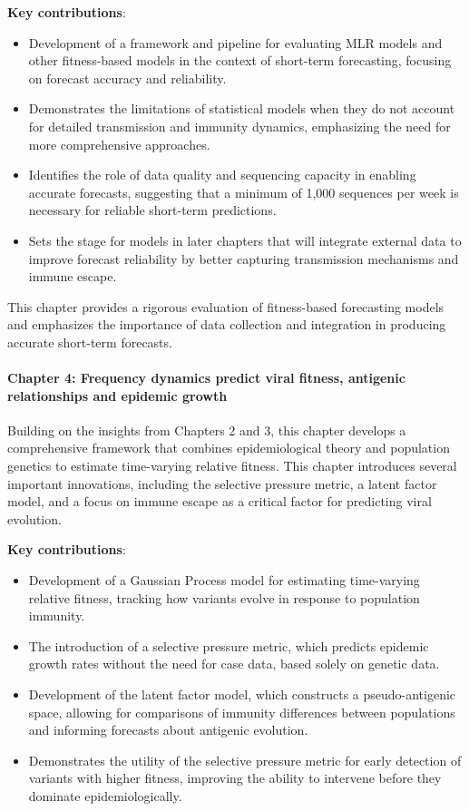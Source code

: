 \noindent\textbf{Key contributions}:
\begin{itemize}
        \item Development of a framework and pipeline for evaluating MLR models and other fitness-based models in the context of short-term forecasting, focusing on forecast accuracy and reliability.
        \item Demonstrates the limitations of statistical models when they do not account for detailed transmission and immunity dynamics, emphasizing the need for more comprehensive approaches.
        \item Identifies the role of data quality and sequencing capacity in enabling accurate forecasts, suggesting that a minimum of 1,000 sequences per week is necessary for reliable short-term predictions.
        \item Sets the stage for models in later chapters that will integrate external data to improve forecast reliability by better capturing transmission mechanisms and immune escape.
\end{itemize}

This chapter provides a rigorous evaluation of fitness-based forecasting models and emphasizes the importance of data collection and integration in producing accurate short-term forecasts.

\paragraph{Chapter 4: Frequency dynamics predict viral fitness, antigenic relationships and epidemic growth}

Building on the insights from Chapters 2 and 3, this chapter develops a comprehensive framework that combines epidemiological theory and population genetics to estimate time-varying relative fitness.
This chapter introduces several important innovations, including the selective pressure metric, a latent factor model, and a focus on immune escape as a critical factor for predicting viral evolution.

\noindent\textbf{Key contributions}:
\begin{itemize}
  \item Development of a Gaussian Process model for estimating time-varying relative fitness, tracking how variants evolve in response to population immunity.
  \item The introduction of a selective pressure metric, which predicts epidemic growth rates without the need for case data, based solely on genetic data.
  \item Development of the latent factor model, which constructs a pseudo-antigenic space, allowing for comparisons of immunity differences between populations and informing forecasts about antigenic evolution.
  \item Demonstrates the utility of the selective pressure metric for early detection of variants with higher fitness, improving the ability to intervene before they dominate epidemiologically.
\end{itemize}

